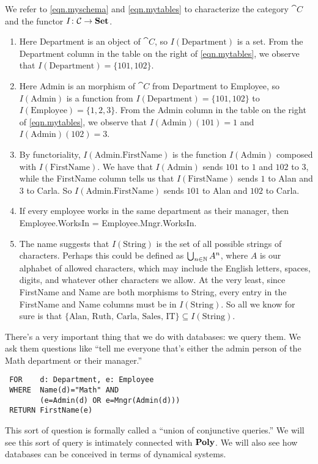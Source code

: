 \documentclass[Book-Poly]{subfiles}
\begin{document}
\begin{exercise}
\begin{solution}
We refer to \eqref{eqn.myschema} and \eqref{eqn.mytables} to characterize the category $\cat{C}$ and the functor $I \colon \mathcal{C} \to \mathbf{Set}$.
\begin{enumerate}
    \item Here Department is an object of $\cat{C}$, so $I(\text{Department})$ is a set. From the Department column in the table on the right of \eqref{eqn.mytables}, we observe that $I(\text{Department}) = \{101, 102\}$.
    \item Here Admin is an morphism of $\cat{C}$ from Department to Employee, so $I(\text{Admin})$ is a function from $I(\text{Department}) = \{101, 102\}$ to $I(\text{Employee}) = \{1, 2, 3\}$. From the Admin column in the table on the right of \eqref{eqn.mytables}, we observe that $I(\text{Admin})(101) = 1$ and $I(\text{Admin})(102) = 3$.
    \item By functoriality, $I(\text{Admin.FirstName})$ is the function $I(\text{Admin})$ composed with $I(\text{FirstName})$.
    We have that $I(\text{Admin})$ sends $101$ to $1$ and $102$ to $3$, while the FirstName column tells us that $I(\text{FirstName})$ sends $1$ to Alan and $3$ to Carla.
    So $I(\text{Admin.FirstName})$ sends $101$ to Alan and $102$ to Carla.
    \item If every employee works in the same department as their manager, then Employee.WorksIn = Employee.Mngr.WorksIn.
    \item The name suggests that $I(\text{String})$ is the set of all possible strings of characters.
    Perhaps this could be defined as $\bigcup_{n \in \mathbb{N}} A^n$, where $A$ is our alphabet of allowed characters, which may include the English letters, spaces, digits, and whatever other characters we allow.
    At the very least, since FirstName and Name are both morphisms to String, every entry in the FirstName and Name columns must be in $I(\text{String})$.
    So all we know for sure is that $\{\text{Alan, Ruth, Carla, Sales, IT}\} \subseteq I(\text{String})$.
\end{enumerate}
\end{solution}
\end{exercise}

There's a very important thing that we do with databases: we query them. We ask them questions like ``tell me everyone that's either the admin person of the Math department or their manager.''
\begin{verbatim}
 FOR    d: Department, e: Employee
 WHERE  Name(d)="Math" AND
        (e=Admin(d) OR e=Mngr(Admin(d)))
 RETURN FirstName(e)
\end{verbatim}
This sort of question is formally called a ``union of conjunctive queries.'' We will see this sort of query is intimately connected with $\mathbf{Poly}$.
We will also see how databases can be conceived in terms of dynamical systems.
\end{document}
